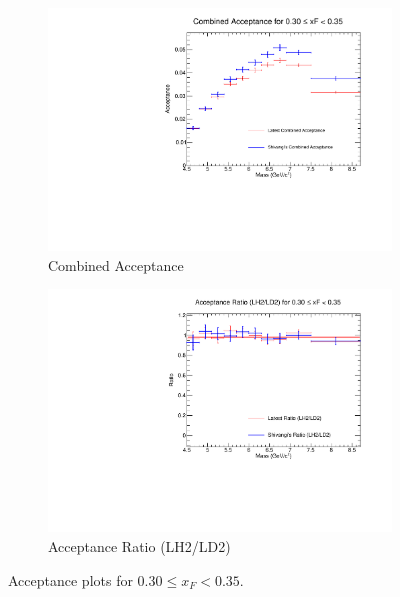 \documentclass[11pt]{article}
\begin{document}
\begin{figure}[p]
\begin{subfigure}[b]{0.48\textwidth}
       \includegraphics[width=\linewidth]{./acceptancePlots/Combined_acceptance_xF_bin_6.pdf}
       \caption{Combined Acceptance}
    \end{subfigure}\hfill
    \begin{subfigure}[b]{0.48\textwidth}
       \includegraphics[width=\linewidth]{./acceptancePlots/Acceptance_ratio_xF_bin_6.pdf}
       \caption{Acceptance Ratio (LH2/LD2)}
    \end{subfigure}
    \caption{Acceptance plots for $0.30 \le x_F < 0.35$.}
\end{figure}
\end{document}

